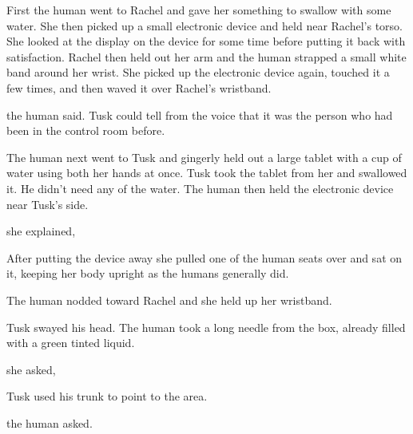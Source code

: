 First the human went to Rachel and gave her something to swallow with some water. She then
picked up a small electronic device and held near Rachel's torso. She looked at the display on
the device for some time before putting it back with satisfaction. Rachel then held out her arm
and the human strapped a small white band around her wrist. She picked up the electronic device
again, touched it a few times, and then waved it over Rachel's wristband.

 the human said. Tusk could tell from the voice that it was the person
who had been in the control room before.

The human next went to Tusk and gingerly held out a large tablet with a cup of water using both
her hands at once. Tusk took the tablet from her and swallowed it. He didn't need any of the
water. The human then held the electronic device near Tusk's side.

 she explained,

After putting the device away she pulled one of the human seats over and sat on it, keeping her
body upright as the humans generally did.



 The human nodded toward Rachel and she held up her wristband.


Tusk swayed his head. The human took a long needle from the box, already filled with a green
tinted liquid.

 she asked, 

Tusk used his trunk to point to the area.

 the human asked.



